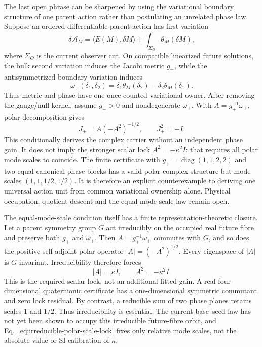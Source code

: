 \documentclass[11pt]{article}
\begin{document}
The last open phrase can be sharpened by using the variational boundary
structure of one parent action rather than postulating an unrelated phase
law. Suppose an ordered differentiable parent action has first variation
\begin{equation}
 \delta\mathcal A_M
 =\langle E(M),\delta M\rangle
  +\int_{\Sigma_O}\theta_M(\delta M),
 \label{eq:parent-boundary-variation}
\end{equation}
where $\Sigma_O$ is the current observer cut. On compatible linearized future
solutions, the bulk second variation induces the Jacobi metric $g_+$, while
the antisymmetrized boundary variation induces
\begin{equation}
 \omega_+(\delta_1,\delta_2)
 =\delta_1\theta_M(\delta_2)-\delta_2\theta_M(\delta_1).
 \label{eq:future-presymplectic-form}
\end{equation}
Thus metric and phase have one once-counted variational owner. After removing
the gauge/null kernel, assume $g_+>0$ and nondegenerate $\omega_+$. With
$A=g_+^{-1}\omega_+$, polar decomposition gives
\begin{equation}
 J_+=A(-A^2)^{-1/2},\qquad J_+^2=-I.
 \label{eq:future-polar-complex-structure}
\end{equation}
This conditionally derives the complex carrier without an independent phase
gain. It does not imply the stronger scalar lock
$A^2=-\kappa^2I$: that requires all polar mode scales to coincide. The finite
certificate with $g_+=\operatorname{diag}(1,1,2,2)$ and two equal canonical
phase blocks has a valid polar complex structure but mode scales
$(1,1,1/2,1/2)$. It is therefore an explicit counterexample to deriving one
universal action unit from common variational ownership alone. Physical
occupation, quotient descent and the equal-mode-scale law remain open.

The equal-mode-scale condition itself has a finite representation-theoretic
closure. Let a parent symmetry group $G$ act irreducibly on the occupied real
future fibre and preserve both $g_+$ and $\omega_+$. Then
$A=g_+^{-1}\omega_+$ commutes with $G$, and so does the positive self-adjoint
polar operator $|A|=(-A^2)^{1/2}$. Every eigenspace of $|A|$ is $G$-invariant.
Irreducibility therefore forces
\begin{equation}
 |A|=\kappa I,\qquad A^2=-\kappa^2I.
 \label{eq:irreducible-polar-scale-lock}
\end{equation}
This is the required scalar lock, not an additional fitted gain. A real
four-dimensional quaternionic certificate has a one-dimensional symmetric
commutant and zero lock residual. By contrast, a reducible sum of two phase
planes retains scales $1$ and $1/2$. Thus irreducibility is essential. The
current base--seed law has not yet been shown to occupy this irreducible
future-fibre orbit, and Eq.~\eqref{eq:irreducible-polar-scale-lock} fixes only
relative mode scales, not the absolute value or SI calibration of $\kappa$.
\end{document}
